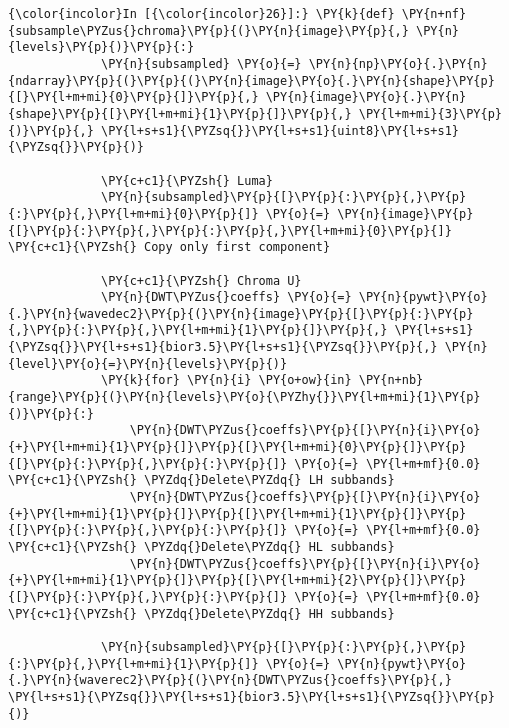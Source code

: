     \begin{Verbatim}[commandchars=\\\{\}]
{\color{incolor}In [{\color{incolor}26}]:} \PY{k}{def} \PY{n+nf}{subsample\PYZus{}chroma}\PY{p}{(}\PY{n}{image}\PY{p}{,} \PY{n}{levels}\PY{p}{)}\PY{p}{:}
             \PY{n}{subsampled} \PY{o}{=} \PY{n}{np}\PY{o}{.}\PY{n}{ndarray}\PY{p}{(}\PY{p}{(}\PY{n}{image}\PY{o}{.}\PY{n}{shape}\PY{p}{[}\PY{l+m+mi}{0}\PY{p}{]}\PY{p}{,} \PY{n}{image}\PY{o}{.}\PY{n}{shape}\PY{p}{[}\PY{l+m+mi}{1}\PY{p}{]}\PY{p}{,} \PY{l+m+mi}{3}\PY{p}{)}\PY{p}{,} \PY{l+s+s1}{\PYZsq{}}\PY{l+s+s1}{uint8}\PY{l+s+s1}{\PYZsq{}}\PY{p}{)}
             
             \PY{c+c1}{\PYZsh{} Luma}
             \PY{n}{subsampled}\PY{p}{[}\PY{p}{:}\PY{p}{,}\PY{p}{:}\PY{p}{,}\PY{l+m+mi}{0}\PY{p}{]} \PY{o}{=} \PY{n}{image}\PY{p}{[}\PY{p}{:}\PY{p}{,}\PY{p}{:}\PY{p}{,}\PY{l+m+mi}{0}\PY{p}{]} \PY{c+c1}{\PYZsh{} Copy only first component}
         
             \PY{c+c1}{\PYZsh{} Chroma U}
             \PY{n}{DWT\PYZus{}coeffs} \PY{o}{=} \PY{n}{pywt}\PY{o}{.}\PY{n}{wavedec2}\PY{p}{(}\PY{n}{image}\PY{p}{[}\PY{p}{:}\PY{p}{,}\PY{p}{:}\PY{p}{,}\PY{l+m+mi}{1}\PY{p}{]}\PY{p}{,} \PY{l+s+s1}{\PYZsq{}}\PY{l+s+s1}{bior3.5}\PY{l+s+s1}{\PYZsq{}}\PY{p}{,} \PY{n}{level}\PY{o}{=}\PY{n}{levels}\PY{p}{)}
             \PY{k}{for} \PY{n}{i} \PY{o+ow}{in} \PY{n+nb}{range}\PY{p}{(}\PY{n}{levels}\PY{o}{\PYZhy{}}\PY{l+m+mi}{1}\PY{p}{)}\PY{p}{:}
                 \PY{n}{DWT\PYZus{}coeffs}\PY{p}{[}\PY{n}{i}\PY{o}{+}\PY{l+m+mi}{1}\PY{p}{]}\PY{p}{[}\PY{l+m+mi}{0}\PY{p}{]}\PY{p}{[}\PY{p}{:}\PY{p}{,}\PY{p}{:}\PY{p}{]} \PY{o}{=} \PY{l+m+mf}{0.0} \PY{c+c1}{\PYZsh{} \PYZdq{}Delete\PYZdq{} LH subbands}
                 \PY{n}{DWT\PYZus{}coeffs}\PY{p}{[}\PY{n}{i}\PY{o}{+}\PY{l+m+mi}{1}\PY{p}{]}\PY{p}{[}\PY{l+m+mi}{1}\PY{p}{]}\PY{p}{[}\PY{p}{:}\PY{p}{,}\PY{p}{:}\PY{p}{]} \PY{o}{=} \PY{l+m+mf}{0.0} \PY{c+c1}{\PYZsh{} \PYZdq{}Delete\PYZdq{} HL subbands}
                 \PY{n}{DWT\PYZus{}coeffs}\PY{p}{[}\PY{n}{i}\PY{o}{+}\PY{l+m+mi}{1}\PY{p}{]}\PY{p}{[}\PY{l+m+mi}{2}\PY{p}{]}\PY{p}{[}\PY{p}{:}\PY{p}{,}\PY{p}{:}\PY{p}{]} \PY{o}{=} \PY{l+m+mf}{0.0} \PY{c+c1}{\PYZsh{} \PYZdq{}Delete\PYZdq{} HH subbands}
         
             \PY{n}{subsampled}\PY{p}{[}\PY{p}{:}\PY{p}{,}\PY{p}{:}\PY{p}{,}\PY{l+m+mi}{1}\PY{p}{]} \PY{o}{=} \PY{n}{pywt}\PY{o}{.}\PY{n}{waverec2}\PY{p}{(}\PY{n}{DWT\PYZus{}coeffs}\PY{p}{,} \PY{l+s+s1}{\PYZsq{}}\PY{l+s+s1}{bior3.5}\PY{l+s+s1}{\PYZsq{}}\PY{p}{)}
                           

\end{Verbatim}
